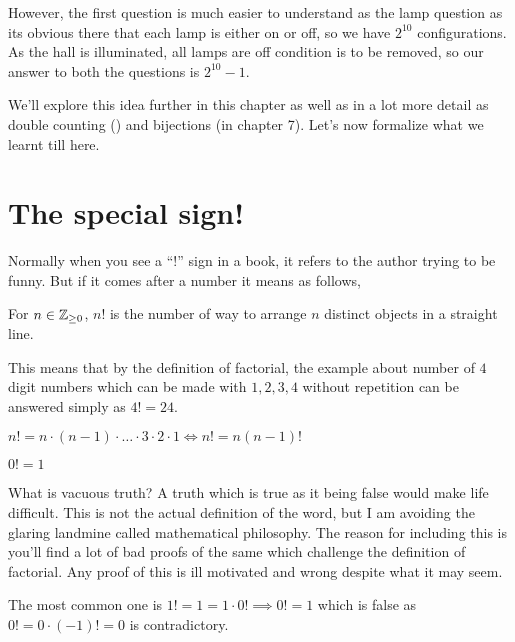 However, the first question is much easier to understand as the lamp question as 
its obvious there that each lamp is either on or off, so we have \(2^{10}\) configurations. 
As the hall is illuminated, all lamps are off condition is to be removed, so our answer to 
both the questions is \(2^{10}-1\).

We'll explore this idea further in this chapter as well as in a lot more detail as 
double counting () and bijections (in chapter 7). Let's now formalize what we learnt till here.


\section{The special sign!}
Normally when you see a ``!'' sign in a book, it refers to the author trying to be funny. 
But if it comes after a number it means as follows,

\begin{definition}
    [Factorial]
    For \(n \in \mathbb Z_{\ge 0}\),
    \(n!\) is the number of way to arrange \(n\) distinct objects in a straight line.
\end{definition}

\noindent This means that by the definition of factorial, the example about number of \(4\) digit numbers 
which can be made with \(1,2,3,4\) without repetition can be answered simply as \(4!=24\).

\begin{theorem}
    \(n! = n \cdot (n-1) \cdot \dots \cdot 3 \cdot 2 \cdot 1 \iff n != n(n-1)!\)
\end{theorem}

\begin{theorem}
    \(0!=1\)
\end{theorem}

What is vacuous truth? A truth which is true as it being false would make life difficult. 
This is not the actual definition of the word, but I am avoiding the glaring landmine called 
mathematical philosophy. The reason for including this is you'll find a lot of bad proofs of 
the same which challenge the definition of factorial. Any proof of this is ill motivated and 
wrong despite what it may seem.

The most common one is \(1!=1=1 \cdot 0! \implies 0!=1\) which is false as \(0! = 0 \cdot (-1) !=0 \) is contradictory.

